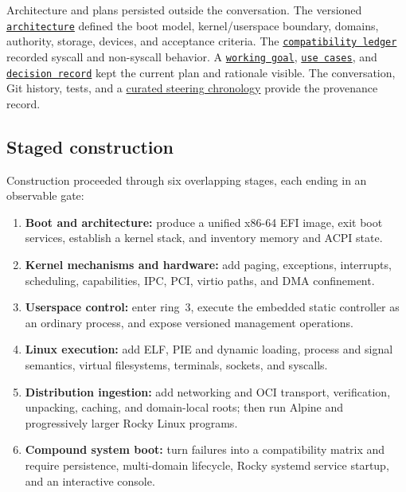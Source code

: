 \documentclass[11pt]{article}
\newcommand{\repolink}[2]{\href{https://github.com/gmkurtzer/ginux/blob/d11c126a048a51fe7eb9c4105f31760add1027ea/#1}{\texttt{#2}}}
\begin{document}
Architecture and plans persisted outside the conversation. The versioned
\repolink{ARCHITECTURE.md}{architecture} defined the boot model,
kernel/userspace boundary, domains, authority, storage, devices, and acceptance
criteria. The \repolink{docs/LINUX-COMPATIBILITY.md}{compatibility ledger}
recorded syscall and non-syscall behavior. A
\repolink{docs/NEXT-GOAL.md}{working goal},
\repolink{docs/USE-CASES.md}{use cases}, and
\repolink{docs/decisions/0001-native-domains-and-authority.md}{decision record}
kept the current plan and rationale visible. The conversation, Git history,
tests, and a
\href{https://github.com/gmkurtzer/ginux/blob/main/docs/paper/STEERING-PROVENANCE.md}{curated
steering chronology} provide the provenance record.

\subsection{Staged construction}

Construction proceeded through six overlapping stages, each ending in an
observable gate:

\begin{enumerate}[leftmargin=*,label=\arabic*.,topsep=0.4em,itemsep=0.3em,parsep=0pt]
\item \textbf{Boot and architecture:} produce a unified x86-64 EFI image, exit
  boot services, establish a kernel stack, and inventory memory and ACPI state.
\item \textbf{Kernel mechanisms and hardware:} add paging, exceptions,
  interrupts, scheduling, capabilities, IPC, PCI, virtio paths, and DMA
  confinement.
\item \textbf{Userspace control:} enter ring~3, execute the embedded static
  controller as an ordinary process, and expose versioned management operations.
\item \textbf{Linux execution:} add ELF, PIE and dynamic loading, process and
  signal semantics, virtual filesystems, terminals, sockets, and syscalls.
\item \textbf{Distribution ingestion:} add networking and OCI transport,
  verification, unpacking, caching, and domain-local roots; then run Alpine and
  progressively larger Rocky Linux programs.
\item \textbf{Compound system boot:} turn failures into a compatibility matrix
  and require persistence, multi-domain lifecycle, Rocky systemd service
  startup, and an interactive console.
\end{enumerate}
\end{document}
